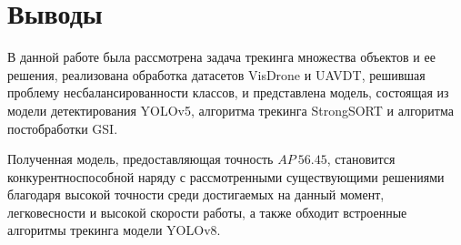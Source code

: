 \section*{Выводы}

В данной работе была рассмотрена задача трекинга множества объектов и ее решения, реализована обработка датасетов VisDrone и UAVDT, решившая проблему несбалансированности классов, и представлена модель, состоящая из модели детектирования YOLOv5, алгоритма трекинга StrongSORT и алгоритма постобработки GSI.

Полученная модель, предоставляющая точность $AP \ 56.45$, становится конкурентноспособной наряду с рассмотренными существующими решениями благодаря высокой точности среди достигаемых на данный момент, легковесности и высокой скорости работы, а также обходит встроенные алгоритмы трекинга модели YOLOv8.
